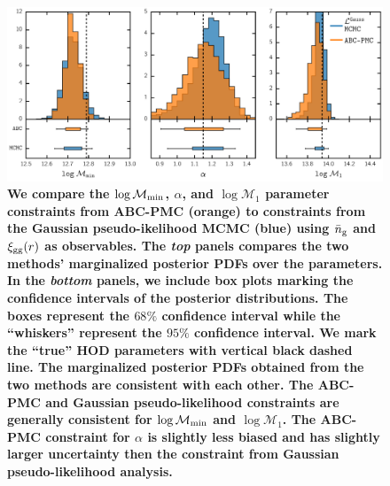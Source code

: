 \documentclass[fleqn,usenatbib]{mnras}
\begin{document}
\begin{figure}
\includegraphics[width=1.\textwidth]{figs/paper_ABCvsMCMC_nbarxi.pdf}
\caption{\label{fig:hist_nbarxi} 
{\bf \color{dred}
We compare the $\log \mathcal{M}_{\rm min}$, $\alpha$, and $\log \mathcal{M}_{1}$ parameter 
constraints from ABC-PMC (orange) to constraints from the Gaussian pseudo-ikelihood MCMC (blue) 
using $\bar{n}_{\mathrm{g}}$ and $\xi_{\mathrm{gg}}(r)$ as observables. The \emph{top} panels compares the two methods' 
marginalized posterior PDFs over the parameters. In the \emph{bottom} panels, we include box 
plots marking the confidence intervals of the posterior distributions. The boxes represent the 
$68\%$ confidence interval while the ``whiskers'' represent the $95\%$ confidence interval. We mark 
the ``true'' HOD parameters with vertical black dashed line. The marginalized posterior PDFs 
obtained from the two methods are consistent with each other. The ABC-PMC and Gaussian pseudo-likelihood
constraints are generally consistent for $\log \mathcal{M}_{\rm min}$ and $\log \mathcal{M}_{1}$. 
The ABC-PMC constraint for $\alpha$ is slightly less biased and has slightly larger uncertainty
then the constraint from Gaussian pseudo-likelihood analysis.} 
}
\end{figure}
\end{document}
